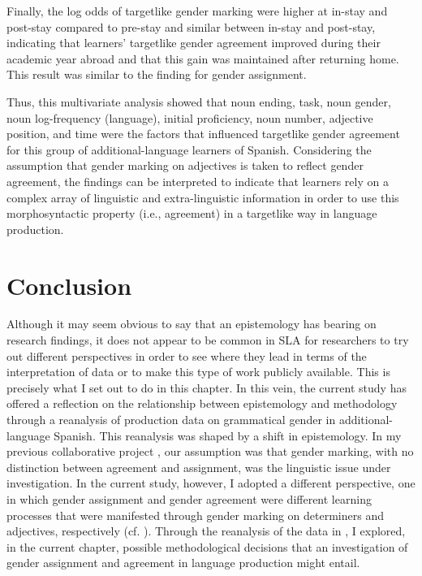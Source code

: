 \documentclass[output=paper,colorlinks,citecolor=brown,modfonts,nonflat]{../langscibook}
\begin{document}
Finally, the log odds of targetlike gender marking were higher at in-stay and post-stay compared to pre-stay and similar between in-stay and post-stay, indicating that learners’ targetlike gender agreement improved during their academic year abroad and that this gain was maintained after returning home. This result was similar to the finding for gender assignment.



Thus, this multivariate analysis showed that noun ending, task, noun gender, noun log-frequency (language), initial proficiency, noun number, adjective position, and time were the factors that influenced targetlike gender agreement for this group of additional-language learners of Spanish. Considering the assumption that gender marking on adjectives is taken to reflect gender agreement, the findings can be interpreted to indicate that learners rely on a complex array of linguistic and extra-linguistic information in order to use this morphosyntactic property (i.e., agreement) in a targetlike way in language production.

\section{Conclusion}\label{sec:gudmestad:4}

Although it may seem obvious to say that an epistemology has bearing on research findings, it does not appear to be common in SLA for researchers to try out different perspectives in order to see where they lead in terms of the interpretation of data or to make this type of work publicly available. This is precisely what I set out to do in this chapter. In this vein, the current study has offered a reflection on the relationship between epistemology and methodology through a reanalysis of production data on grammatical gender in additional-language Spanish. This reanalysis was shaped by a shift in epistemology. In my previous collaborative project \citep{GudmestadEtAl2019}, our assumption was that gender marking, with no distinction between agreement and assignment, was the linguistic issue under investigation. In the current study, however, I adopted a different perspective, one in which gender assignment and gender agreement were different learning processes that were manifested through gender marking on determiners and adjectives, respectively (cf. \citealt{Alarcón2010,KupischEtAl2013}). Through the reanalysis of the data in \citeauthor{GudmestadEtAl2019}, I explored, in the current chapter, possible methodological decisions that an investigation of gender assignment and agreement in language production might entail. 
\end{document}
